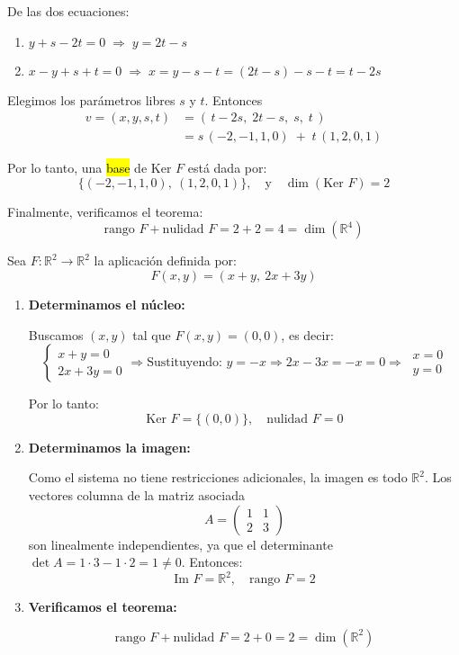 \begin{enumerate}[label=\alph*.]
  De las dos ecuaciones:
  \begin{enumerate}
    \item \(y + s - 2t = 0 \;\Rightarrow\; y = 2t - s\)
    \item \(x - y + s + t = 0 \;\Rightarrow\; x = y - s - t = (2t - s) - s - t = t - 2s\)
  \end{enumerate}
  Elegimos los parámetros libres \(s\) y \(t\). Entonces
  \begin{align*}
    v = (x,y,s,t) &= (\,t - 2s,\;2t - s,\;s,\;t\,) \\
    &= s\,(-2,-1,1,0)\;+\; t\,(1,2,0,1)
  \end{align*}

  Por lo tanto, una \hl{base} de \(\text{Ker } F\) está dada por:
  \[
    \{(-2,-1,1,0),\ (1,2,0,1)\}, \quad \text{y} \quad \dim(\text{Ker } F) = 2
  \]

  Finalmente, verificamos el teorema:
  \[
    \text{rango } F + \text{nulidad } F = 2 + 2 = 4 = \dim(\mathbb{R}^4)
  \]

\end{enumerate}


Sea \(F : \mathbb{R}^2 \rightarrow \mathbb{R}^2\) la aplicación definida por:
\[
F(x,y) = (x + y,\ 2x + 3y)
\]

\begin{enumerate}[label=\alph*.]
  \item \textbf{Determinamos el núcleo:}

  Buscamos \((x,y)\) tal que \(F(x,y) = (0,0)\), es decir:
  \[
  \begin{cases}
    x + y = 0 \\
    2x + 3y = 0
  \end{cases}
  \Rightarrow \text{Sustituyendo: } y = -x \Rightarrow 2x - 3x = -x = 0 \Rightarrow  ~ \begin{array}{c}
    x = 0 \\ y = 0
  \end{array}
  \]

  Por lo tanto:
  \[
  \text{Ker } F = \{(0,0)\}, \quad \text{nulidad } F = 0
  \]

  \item \textbf{Determinamos la imagen:}

  Como el sistema no tiene restricciones adicionales, la imagen es todo \(\mathbb{R}^2\). Los vectores columna de la matriz asociada
  \[
  A = \begin{pmatrix}
    1 & 1 \\
    2 & 3
  \end{pmatrix}
  \]
  son linealmente independientes, ya que el determinante \(\det A = 1 \cdot 3 - 1 \cdot 2 = 1 \ne 0\). Entonces:
  \[
  \text{Im } F = \mathbb{R}^2, \quad \text{rango } F = 2
  \]

  \item \textbf{Verificamos el teorema:}

  \[
  \text{rango } F + \text{nulidad } F = 2 + 0 = 2 = \dim(\mathbb{R}^2)
  \]

\end{enumerate}

